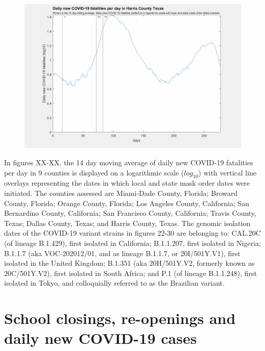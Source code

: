 \documentclass[]{article}
\begin{document}
\begin{figure}[!h]
	\includegraphics[width=\linewidth]{images/harris_mask_order_fatalities_log.png}
	\caption{}
	\label{fig:images/harris_mask_order_fatalities_logLabel}
\end{figure}

\FloatBarrier

In figures XX-XX, the 14 day moving average of daily new COVID-19 fatalities per day in 9 counties is displayed on a logarithmic scale ($log_{10}$) with vertical line overlays representing the dates in which local and state mask order dates were initiated. The counties assessed are Miami-Dade County, Florida; Broward County, Florida; Orange County, Florida; Los Angeles County, California; San Bernardino County, California; San Francisco County, California; Travis County, Texas; Dallas County, Texas; and Harris County, Texas. The genomic isolation dates of the COVID-19 variant strains in figures 22-30 are belonging to: CAL.20C (of lineage B.1.429), first isolated in California; B.1.1.207, first isolated in Nigeria; B.1.1.7 (aka VOC-202012/01, and as lineage B.1.1.7, or 20I/501Y.V1), first isolated in the United Kingdom; B.1.351 (aka 20H/501Y.V2, formerly known as 20C/501Y.V2), first isolated in South Africa; and P.1 (of lineage B.1.1.248), first isolated in Tokyo, and colloquially referred to as the Brazilian variant.

\FloatBarrier
\vspace{5mm}
\section*{School closings, re-openings and daily new COVID-19 cases  }
\end{document}
